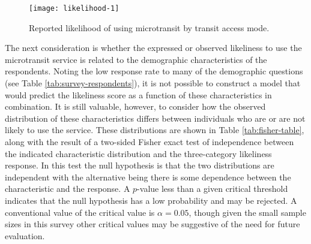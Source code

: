 \documentclass[smartcities,article,submit,moreauthors,pdftex]{Definitions/mdpi}
\begin{document}
\begin{figure}
\texttt{[image: likelihood-1]} \caption{Reported likelihood of using microtransit by transit access mode.}\label{fig:likelihood}
\end{figure}

The next consideration is whether the expressed or observed likeliness to use the microtransit service is related to the demographic characteristics of the respondents. Noting the low response rate to many of the demographic questions (see Table \ref{tab:survey-respondents}), it is not possible to construct a model that would predict the likeliness score as a function of these characteristics in combination. It is still valuable, however, to consider how the observed distribution of these characteristics differs between individuals who are or are not likely to use the service. These distributions are shown in Table \ref{tab:fisher-table}, along with the result of a two-sided Fisher exact test of independence between the indicated characteristic distribution and the three-category likeliness response. In this test the null hypothesis is that the two distributions are independent with the alternative being there is some dependence between the characteristic and the response. A \(p\)-value less than a given critical threshold indicates that the null hypothesis has a low probability and may be rejected. A conventional value of the critical value is \(\alpha=0.05\), though given the small sample sizes in this survey other critical values may be suggestive of the need for future evaluation.
\end{document}
